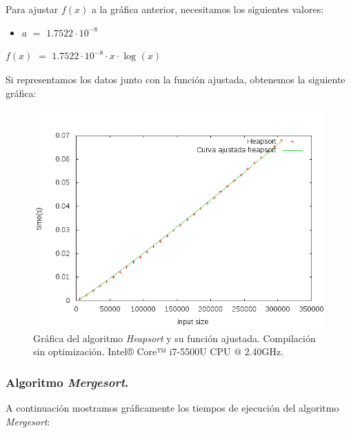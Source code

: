 \documentclass[11pt,a4paper]{article}
\begin{document}
				\par
				Para ajustar $f(x)$ a la gráfica anterior, necesitamos los siguientes valores:

				\begin{itemize}

					\item
					$a$ $=$ $1.7522\cdot 10^{-8}$

				\end{itemize}

				\par
				$f(x)$ $=$ $ 1.7522\cdot 10^{-8}\cdot x \cdot \log_{}(x)$

\newpage

				\par
				Si representamos los datos junto con la función ajustada, obtenemos la siguiente gráfica:

				\begin{figure}[h]

					\centering
					\includegraphics[width=1\textwidth]{heapsort_ajustado.png}
					\caption{Gráfica del algoritmo \textit{Heapsort} y su función ajustada. Compilación sin optimización. Intel® Core™ i7-5500U CPU @ 2.40GHz.}

				\end{figure}

\newpage

			\subsubsection{Algoritmo \textit{Mergesort}.}

				\par
				A continuación mostramos gráficamente los tiempos de ejecución del algoritmo \textit{Mergesort}:
\end{document}
